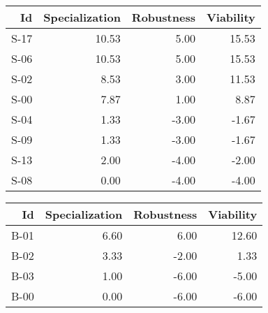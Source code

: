 

\begin{tabular}{ | r | r | r | r | }
    \hline
                    Id  &  Specialization  &      Robustness  &       Viability  \\
    \hline
    \hline
                  S-17  &           10.53  &            5.00  &           15.53  \\
    \hline
                  S-06  &           10.53  &            5.00  &           15.53  \\
    \hline
                  S-02  &            8.53  &            3.00  &           11.53  \\
    \hline
                  S-00  &            7.87  &            1.00  &            8.87  \\
    \hline
                  S-04  &            1.33  &           -3.00  &           -1.67  \\
    \hline
                  S-09  &            1.33  &           -3.00  &           -1.67  \\
    \hline
                  S-13  &            2.00  &           -4.00  &           -2.00  \\
    \hline
                  S-08  &            0.00  &           -4.00  &           -4.00  \\
    \hline
\end{tabular}


\begin{tabular}{ | r | r | r | r | }
    \hline
                    Id  &  Specialization  &      Robustness  &       Viability  \\
    \hline
    \hline
                  B-01  &            6.60  &            6.00  &           12.60  \\
    \hline
                  B-02  &            3.33  &           -2.00  &            1.33  \\
    \hline
                  B-03  &            1.00  &           -6.00  &           -5.00  \\
    \hline
                  B-00  &            0.00  &           -6.00  &           -6.00  \\
    \hline
\end{tabular}


